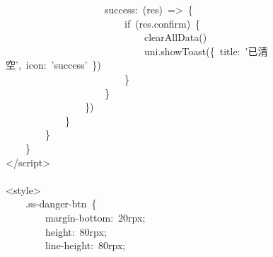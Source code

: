 \documentclass[a4paper,10pt]{article}
\begin{document}
{~~~~~~~~~~~~~~~~~~~~success:~(res)~=>~\{\\
~~~~~~~~~~~~~~~~~~~~~~~~if~(res.confirm)~\{\\
~~~~~~~~~~~~~~~~~~~~~~~~~~~~clearAllData()\\
~~~~~~~~~~~~~~~~~~~~~~~~~~~~uni.showToast(\{~title:~'已清空',~icon:~'success'~\})\\
~~~~~~~~~~~~~~~~~~~~~~~~\}\\
~~~~~~~~~~~~~~~~~~~~\}\\
~~~~~~~~~~~~~~~~\})\\
~~~~~~~~~~~~\}\\
~~~~~~~~\}\\
~~~~\}\\
</script>\\
\mbox{}\\
<style>\\
~~~~.ss-danger-btn~\{\\
~~~~~~~~margin-bottom:~20rpx;\\
~~~~~~~~height:~80rpx;\\
~~~~~~~~line-height:~80rpx;
}

\newpage
\end{document}
